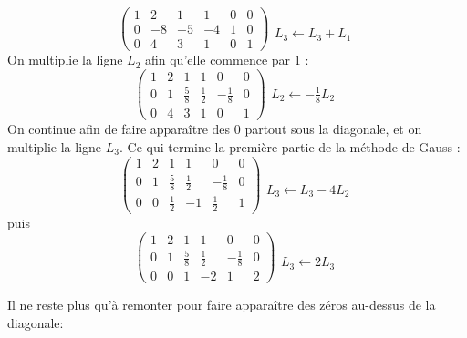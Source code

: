 \documentclass[class=report,crop=false]{standalone}
\begin{document}
$$
\left(\begin{array}{ccc|ccc}
1 & 2 & 1 & 1 & 0 & 0\\
0 & -8 & -5 & -4 & 1 & 0\\
0 & 4 & 3 & 1 & 0 & 1
\end{array}\right)
\begin{array}{l} ~ \\ ~ \\ {\scriptstyle L_3 \leftarrow L_3 + L_1}   \end{array}
$$
On multiplie la ligne $L_2$ afin qu'elle commence par $1$ :
$$
\left(\begin{array}{ccc|ccc}
1 & 2 & 1 & 1 & 0 & 0\\
0 & 1 & \frac58 & \frac12 & -\frac18 & 0\\
0 & 4 & 3 & 1 & 0 & 1
\end{array}\right)
\begin{array}{l} ~ \\  {\scriptstyle L_2 \leftarrow -\frac{1}{8} L_2} \\ ~ \end{array}
$$
On continue afin de faire apparaître des $0$ partout sous la diagonale,
et on multiplie la ligne $L_3$.
Ce qui termine la première partie de la méthode de Gauss :
$$
\left(\begin{array}{ccc|ccc}
1 & 2 & 1 & 1 & 0 & 0\\
0 & 1 & \frac58 & \frac12 & -\frac18 & 0\\
0 & 0 & \frac12 & -1 & \frac12 & 1
\end{array}\right)
\begin{array}{l} \\  \\ {\scriptstyle L_3 \leftarrow L_3 -4L_2}   \end{array}
$$
puis
$$
\left(\begin{array}{ccc|ccc}
1 & 2 & 1 & 1 & 0 & 0\\
0 & 1 & \frac58 & \frac12 & -\frac18 & 0\\
0 & 0 & 1 & -2 & 1 & 2
\end{array}\right)
\begin{array}{l}  \\  \\ {\scriptstyle L_3 \leftarrow 2L_3}   \end{array}
$$

Il ne reste plus qu'à \og remonter \fg{} pour faire apparaître des zéros au-dessus de la diagonale:
\end{document}
